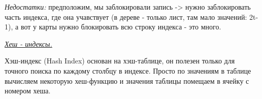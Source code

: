 \textit{Недостатки:} предположим, мы заблокировали запись -> нужно заблокировать часть индекса, где она учавствует (в дереве - только лист, там мало значений: 2t-1), а вот у карты нужно блокировать всю строку индекса - это много.

\begin{center}
\textit{\underline{Хеш - индексы.}}
\end{center}


Хэш-индекс (Hash Index) основан на хэш-таблице, он полезен только для точного поиска по каждому столбцу в индексе. Просто по значениям в таблице вычисляем некоторую хеш-функцию и значения таблицы помещаем в ячейку с номером хеша. 

